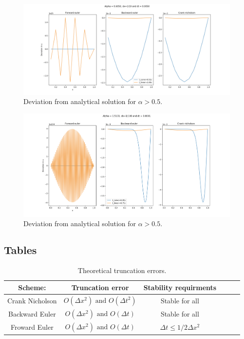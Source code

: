 \documentclass{article}
\begin{document}
\begin{figure}[H]
	\centering
	\includegraphics[width=180mm]{1_10_a}
	\caption{Deviation from analytical solution for $\alpha>0.5$.}
	\label{fig:1_10_a}
\end{figure}

\begin{figure}[H]
	\centering
	\includegraphics[width=140mm]{1_100_a}
	\caption{Deviation from analytical solution for $\alpha>0.5$.}
	\label{fig:1_100_a}
\end{figure}

\subsection{Tables}


\begin{table}[H]
\begin{center}
\caption{Theoretical truncation errors.}
\begin{tabular}{  |c|c|c|c|c|c| } \hline
Scheme:&	Truncation error&Stability requirments \\ \hline
Crank Nicholson&$O(\Delta x^2) \text{ and } O(\Delta t^2)$&Stable for all\\ \hline
Backward Euler&$O(\Delta x^2)  \text{ and } O(\Delta t)$&Stable for all\\ \hline
Froward Euler&$O(\Delta x^2)  \text{ and } O(\Delta t)$&$\Delta t \leq 1/2\Delta x^2$\\ \hline
\end{tabular}
\label{tab:a}
\end{center}
\end{table}
\end{document}
